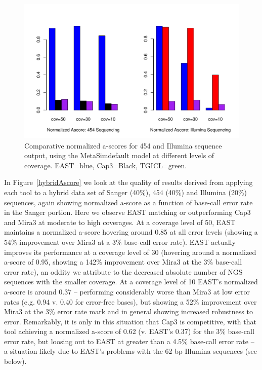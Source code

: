 \documentclass[10pt]{bmc_article}
\newcommand{\capthree} {{\small Cap3}}
\newcommand{\metasim} {{\small MetaSim}}
\newcommand{\tgicl} {{\small TGICL}}
\newcommand{\east} {{\small EAST}}
\newcommand{\mira}{{\small Mira3}}
\newenvironment{bmcformat}{\begin{raggedright}\baselineskip20pt\sloppy\setboolean{publ}{false}}{\end{raggedright}\baselineskip20pt\sloppy}
\begin{document}
\begin{bmcformat}
\begin{figure}[htb]
\centerline{\includegraphics[width=6in]{pics.d/ascore_nxtgen.pdf}}
\caption{Comparative normalized a-scores for 454 and Illumina sequence
  output, using the \metasim default model at different levels
  of coverage.  \east=blue, \capthree=Black, \tgicl=green.  }
\label{nextgenAscore}
\end{figure}

 In Figure~\ref{hybridAscore} we look at the
quality of results derived from applying each tool to a hybrid data
set of Sanger (40\%), 454 (40\%) and Illumina (20\%) sequences, again
showing normalized a-score as a function of base-call error rate in
the Sanger portion.  Here we observe \east\/ matching or outperforming
\capthree\/ and \mira\/ at moderate to high coverages.  At a coverage
level of 50, \east\/ maintains a normalized a-score hovering around
0.85 at all error levels (showing a 54\% improvement over \mira\/ at a
3\% base-call error rate).  \east\/ actually improves its performance
at a coverage level of 30 (hovering around a normalized a-score of
0.95, showing a 142\% improvement over \mira\/ at the 3\% base-call error
rate), an oddity we attribute to the decreased absolute number of NGS
sequences with the smaller coverage.  At a coverage level of 10
\east's normalized a-score is around 0.37 -- performing considerably
worse than \mira\/ at low error rates (e.g. 0.94 v. 0.40 for
error-free bases), but showing a 52\% improvement over \mira\/ at the
3\% error rate mark and in general showing increased robustness to
error.  Remarkably, it is only in this situation that \capthree\/ is
competitive, with that tool achieving a normalized a-score of 0.62
(v. \east's 0.37) for the 3\% base-call error rate, but loosing out to
\east\/ at greater than a 4.5\% base-call error rate -- a situation
likely due to \east's problems with the 62 bp Illumina sequences (see
below).


\end{bmcformat}
\end{document}
